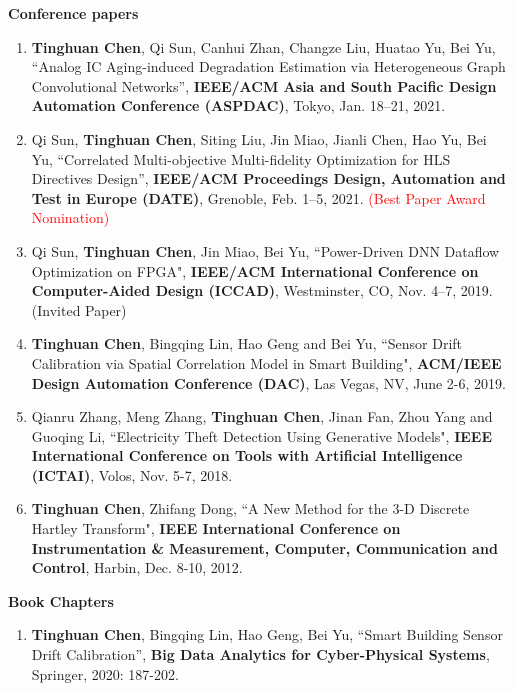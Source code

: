\documentclass[letterpaper,11pt]{article}%
\begin{document}
\textbf{Conference papers}

\begin{enumerate}[(1)]


\item \textbf{Tinghuan Chen}, Qi Sun, Canhui Zhan, Changze Liu, Huatao Yu, Bei Yu, ``Analog IC Aging-induced Degradation Estimation via Heterogeneous Graph Convolutional Networks'', \textbf{IEEE/ACM Asia and South Pacific Design Automation Conference (ASPDAC)}, Tokyo, Jan. 18–21, 2021.

\item Qi Sun, \textbf{Tinghuan Chen}, Siting Liu, Jin Miao, Jianli Chen, Hao Yu, Bei Yu, ``Correlated Multi-objective Multi-fidelity Optimization for HLS Directives Design'', \textbf{IEEE/ACM Proceedings Design, Automation and Test in Europe (DATE)}, Grenoble, Feb. 1–5, 2021. \textcolor{red}{(Best Paper Award Nomination)}


\item Qi Sun, \textbf{Tinghuan Chen}, Jin Miao, Bei Yu, ``Power-Driven DNN Dataflow Optimization on FPGA", \textbf{IEEE/ACM International Conference on Computer-Aided Design (ICCAD)}, Westminster, CO, Nov. 4–7, 2019. (Invited Paper)

\item \textbf{Tinghuan Chen}, Bingqing Lin, Hao Geng and Bei Yu, ``Sensor Drift Calibration via Spatial Correlation Model in Smart Building", \textbf{ACM/IEEE Design Automation Conference (DAC)}, Las Vegas, NV, June 2-6, 2019.



\item Qianru Zhang, Meng Zhang, \textbf{Tinghuan Chen}, Jinan Fan, Zhou Yang and Guoqing Li, ``Electricity Theft Detection Using Generative Models", \textbf{IEEE International Conference on Tools with Artificial Intelligence (ICTAI)}, Volos, Nov. 5-7, 2018.


\item \textbf{Tinghuan Chen}, Zhifang Dong, ``A New Method for the 3-D Discrete Hartley Transform", \textbf{IEEE International Conference on Instrumentation \& Measurement, Computer, Communication and Control}, Harbin, Dec. 8-10, 2012.

\end{enumerate}

\textbf{Book Chapters}

\begin{enumerate}[(1)]


\item \textbf{Tinghuan Chen}, Bingqing Lin, Hao Geng, Bei Yu, ``Smart Building Sensor Drift Calibration'', \textbf{Big Data Analytics for Cyber-Physical Systems}, Springer, 2020: 187-202.



\end{enumerate}
\end{document}
